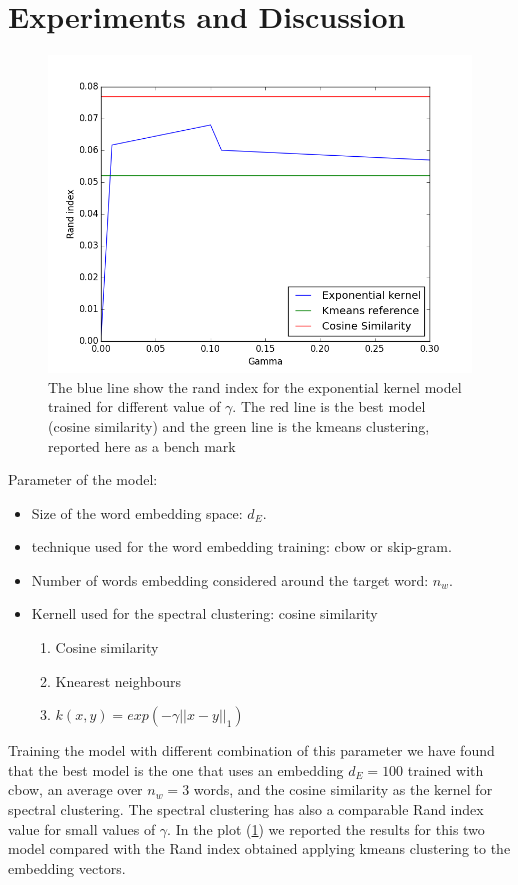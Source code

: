 \documentclass[]{article}
\begin{document}
\section{Experiments and Discussion}
\begin{figure}  \label{best} 
\includegraphics[width=1\linewidth]{Figures_Mik/results.png} 
    \caption{The blue line show the rand index for the  exponential kernel model trained for different value of $\gamma$. The red line is the best model (cosine similarity) and the green line is the kmeans clustering, reported here as a bench mark } 
\end{figure}
Parameter of the model:
\begin{itemize}  \label{confusion} 
\item Size of the word  embedding space: $d_E$.
\item technique used for the word embedding training: cbow  or skip-gram.
\item Number of words embedding considered around the target word: $n_w$.
\item Kernell used for the spectral clustering: cosine similarity 
\begin{enumerate}
\item Cosine similarity 
\item Knearest neighbours 
\item $k(x,y)=exp(-\gamma ||x-y||_1)$
\end{enumerate} 
\end{itemize}  
Training the model with different combination of this parameter we have found that the best model is the one that uses an embedding $d_E=100$ trained with cbow, an average over $n_w=3$ words, and the cosine similarity as the kernel for spectral clustering. The spectral clustering has also a comparable Rand index value for small values of $\gamma$. In the plot (\ref{best}) we reported the results for this two model compared with the Rand index obtained applying kmeans clustering to the embedding vectors. 
\end{document}
